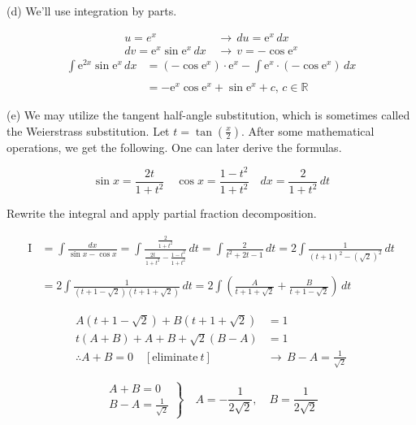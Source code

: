 \documentclass{article}
\begin{document}
\hfill

\noindent (d) We'll use integration by parts.

\begin{align*}u=e^x\,&\rightarrow\,du=\mathrm{e}^x\,dx \\dv=\mathrm{e}^x\sin \mathrm{e}^x \,dx \,&\rightarrow\,v=-\cos\mathrm{e}^x\end{align*}
\begin{align*}\int\mathrm{e}^{2x}\sin\mathrm{e}^x\,dx&=(-\cos\mathrm{e}^x)\cdot\mathrm{e}^x-\int\mathrm{e}^x\cdot(-\cos\mathrm{e}^x)\,dx\\\\&=\boxed{-\mathrm{e}^x\cos \mathrm{e}^x +\sin \mathrm{e}^x + c, \,c \in \mathbb{R}} \end{align*}

\hfill

\noindent (e) We may utilize the tangent half-angle substitution, which is sometimes called the Weierstrass substitution. Let $\displaystyle t = \tan\left(\frac x2\right)$. After some mathematical operations, we get the following. One can later derive the formulas.

\[\sin x={\frac{2t}{1+t^{2}}}\quad\cos x={\frac{1-t^{2}}{1+t^{2}}}\quad dx={\frac2{1+t^{2}}}\,dt\]

\hfill

\noindent Rewrite the integral and apply partial fraction decomposition.

\begin{align}
\mathrm{I} &= \int\frac{dx}{\sin x - \cos x} = \int\frac{\frac2{1+t^2}}{\frac{2t}{1+t^2} -\frac{1-t^2}{1+t^2}}\,dt=\int\frac2{t^2+2t-1}\,dt=2\int\frac1{(t+1)^2-(\sqrt2)^2}\,dt\nonumber\\\nonumber\\&=2\int\frac 1{\left(t+1-\sqrt2\right)\left(t+1+\sqrt2\right)}\,dt=2\int\left( \frac A{t+1+\sqrt2} + \frac B{t+1-\sqrt2}\right)\,dt
\end{align}

\begin{align*}
A(t+1-\sqrt2)+B(t+1+\sqrt2)&=1\\
t(A+B)+A+B+\sqrt2(B-A)&=1\\
\therefore A+B=0\quad[\text{eliminate}\:t]\,&\rightarrow\,B-A=\frac1{\sqrt2}
\end{align*}

\[
\left.
\begin{array}{ll}
A+B=0\\
\displaystyle B-A=\frac1{\sqrt2}
\end{array}
\right\}
\quad A=-\frac1{2\sqrt2},\quad B=\frac1{2\sqrt2}
\]
\end{document}
